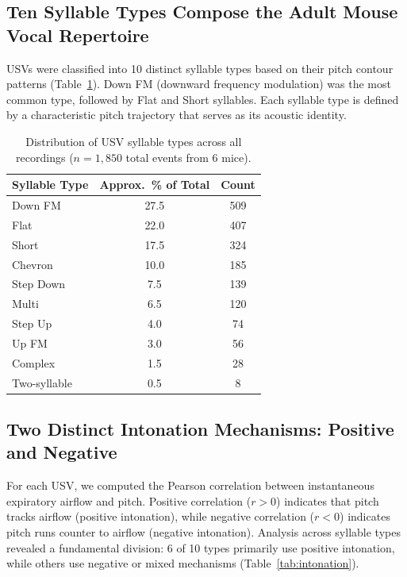 \documentclass[11pt]{article}
\begin{document}
\subsection{Ten Syllable Types Compose the Adult Mouse Vocal Repertoire}

USVs were classified into 10 distinct syllable types based on their pitch contour patterns (Table~\ref{tab:syllable_distribution}). Down FM (downward frequency modulation) was the most common type, followed by Flat and Short syllables. Each syllable type is defined by a characteristic pitch trajectory that serves as its acoustic identity.

\begin{table}[H]
\centering
\caption{Distribution of USV syllable types across all recordings ($n = 1{,}850$ total events from 6 mice).}
\label{tab:syllable_distribution}
\begin{tabular}{lcc}
\toprule
\textbf{Syllable Type} & \textbf{Approx.\ \% of Total} & \textbf{Count} \\
\midrule
Down FM & 27.5 & 509 \\
Flat & 22.0 & 407 \\
Short & 17.5 & 324 \\
Chevron & 10.0 & 185 \\
Step Down & 7.5 & 139 \\
Multi & 6.5 & 120 \\
Step Up & 4.0 & 74 \\
Up FM & 3.0 & 56 \\
Complex & 1.5 & 28 \\
Two-syllable & 0.5 & 8 \\
\bottomrule
\end{tabular}
\end{table}

\subsection{Two Distinct Intonation Mechanisms: Positive and Negative}

For each USV, we computed the Pearson correlation between instantaneous expiratory airflow and pitch. Positive correlation ($r > 0$) indicates that pitch tracks airflow (positive intonation), while negative correlation ($r < 0$) indicates pitch runs counter to airflow (negative intonation). Analysis across syllable types revealed a fundamental division: 6 of 10 types primarily use positive intonation, while others use negative or mixed mechanisms (Table~\ref{tab:intonation}).
\end{document}
